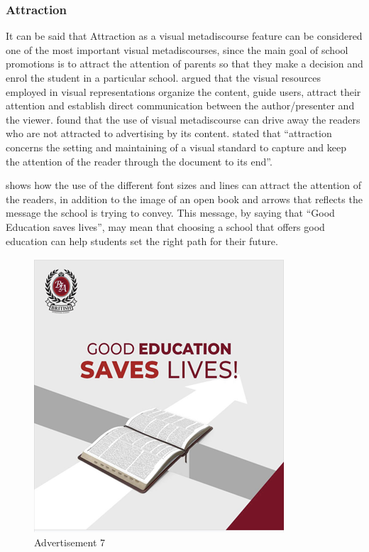 \documentclass[english]{textolivre}
\begin{document}
\subsubsection{Attraction}\label{sec-resumo}
It can be said that Attraction as a visual metadiscourse feature can be considered one of the most important visual metadiscourses, since the main goal of school promotions is to attract the attention of parents so that they make a decision and enrol the student in a particular school. \textcite{Bgdan_2020} argued that the visual resources employed in visual representations organize the content, guide users, attract their attention and establish direct communication between the author/presenter and the viewer. \textcite{kumpf_visual_2000} found that the use of visual metadiscourse can drive away the readers who are not attracted to advertising by its content. \textcite[p.~34]{al-subhi_metadiscourse_2022} stated that “attraction concerns the setting and maintaining of a visual standard to capture and keep the attention of the reader through the document to its end”.

 shows how the use of the different font sizes and lines can attract the attention of the readers, in addition to the image of an open book and arrows that reflects the message the school is trying to convey. This message, by saying that “Good Education saves lives”, may mean that choosing a school that offers good education can help students set the right path for their future.

\begin{figure}[htbp]
\centering
\begin{minipage}{0.5\textwidth}
\includegraphics[width=\linewidth]{Fig7.png}
\caption{Advertisement 7}
\label{fig7}
\end{minipage}
\end{figure}
\end{document}
